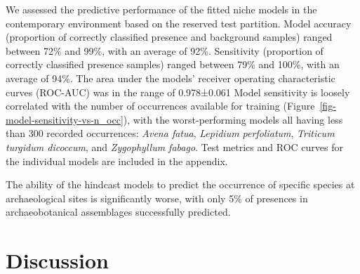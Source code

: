 \documentclass[
  authoryear,
  preprint]{elsarticle}
\begin{document}
We assessed the predictive performance of the fitted niche models in the
contemporary environment based on the reserved test partition. Model
accuracy (proportion of correctly classified presence and background
samples) ranged between 72\% and 99\%, with an average of 92\%.
Sensitivity (proportion of correctly classified presence samples) ranged
between 79\% and 100\%, with an average of 94\%. The area under the
models' receiver operating characteristic curves (ROC-AUC) was in the
range of 0.978±0.061 Model sensitivity is loosely correlated with the
number of occurrences available for training
(Figure~\ref{fig-model-sensitivity-vs-n_occ}), with the worst-performing
models all having less than 300 recorded occurrences: \emph{Avena
fatua}, \emph{Lepidium perfoliatum}, \emph{Triticum turgidum dicoccum},
and \emph{Zygophyllum fabago}. Test metrics and ROC curves for the
individual models are included in the appendix.

The ability of the hindcast models to predict the occurrence of specific
species at archaeological sites is significantly worse, with only 5\% of
presences in archaeobotanical assemblages successfully predicted.

\section{Discussion}\label{discussion}

\begingroup
\setlength{}
\setlength{}\fontsize{8.2pt}{9.9pt}\selectfont
\end{document}
